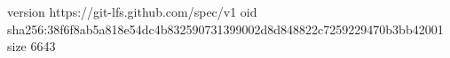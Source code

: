version https://git-lfs.github.com/spec/v1
oid sha256:38f6f8ab5a818e54dc4b832590731399002d8d848822c7259229470b3bb42001
size 6643
